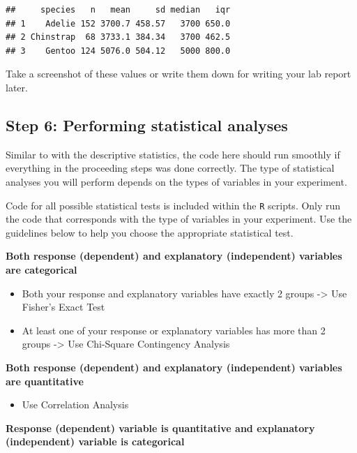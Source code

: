 \documentclass[
]{book}
\providecommand{\tightlist}{%
  \setlength{\itemsep}{0pt}\setlength{\parskip}{0pt}}
\begin{document}
\begin{verbatim}
##     species   n   mean     sd median   iqr
## 1    Adelie 152 3700.7 458.57   3700 650.0
## 2 Chinstrap  68 3733.1 384.34   3700 462.5
## 3    Gentoo 124 5076.0 504.12   5000 800.0
\end{verbatim}

Take a screenshot of these values or write them down for writing your lab report later.

\hypertarget{step-6-performing-statistical-analyses}{%
\subsection*{Step 6: Performing statistical analyses}\label{step-6-performing-statistical-analyses}}

Similar to with the descriptive statistics, the code here should run smoothly if everything in the proceeding steps was done correctly. The type of statistical analyses you will perform depends on the types of variables in your experiment.

Code for all possible statistical tests is included within the \texttt{R} scripts. Only run the code that corresponds with the type of variables in your experiment. Use the guidelines below to help you choose the appropriate statistical test.

\textbf{Both response (dependent) and explanatory (independent) variables are categorical}

\begin{itemize}
\tightlist
\item
  Both your response and explanatory variables have exactly 2 groups -\textgreater{} Use Fisher's Exact Test
\item
  At least one of your response or explanatory variables has more than 2 groups -\textgreater{} Use Chi-Square Contingency Analysis
\end{itemize}

\textbf{Both response (dependent) and explanatory (independent) variables are quantitative}

\begin{itemize}
\tightlist
\item
  Use Correlation Analysis
\end{itemize}

\textbf{Response (dependent) variable is quantitative and explanatory (independent) variable is categorical}
\end{document}

